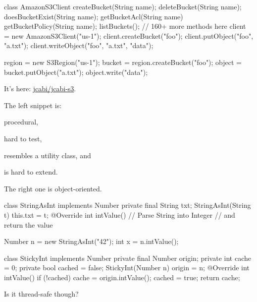 \documentclass{article}
\begin{document}

\begin{pptWide}{2}
{\scriptsize\begin{ffcode}
class AmazonS3Client {
  createBucket(String name);
  deleteBucket(String name);
  doesBucketExist(String name);
  getBucketAcl(String name)
  getBucketPolicy(String name);
  listBuckets();
  // 160+ more methods here
}
client = new AmazonS3Client("us-1");
client.createBucket("foo");
client.putObject("foo", "a.txt");
client.writeObject("foo", "a.txt", "data");
\end{ffcode}
}
\par\columnbreak\par
{\scriptsize\begin{ffcode}
region = new S3Region("us-1");
bucket = region.createBucket("foo");
object = bucket.putObject("a.txt");
object.write("data");
\end{ffcode}
}
It's here: \href{https://github.com/jcabi/jcabi-s3}{jcabi/jcabi-s3}.
\end{pptWide}
\par
The left snippet is:
\begin{inparaenum}[1)]
\item procedural,
\item hard to test,
\item resembles a utility class,
and
\item is hard to extend.
\end{inparaenum}
The right one is object-oriented.
\plush{}


\begin{pptWide}{2}
{\small\begin{ffcode}
class StringAsInt implements Number {
  private final String txt;
  StringAsInt(String t) { this.txt = t; }
  @Override int intValue() {
    // Parse String into Integer
    // and return the value
  }
}

Number n = new StringAsInt("42");
int x = n.intValue();
\end{ffcode}
}
\par\columnbreak\par
{\small\begin{ffcode}
class StickyInt implements Number {
  private final Number origin;
  private int cache = 0;
  private bool cached = false;
  StickyInt(Number n) { origin = n; }
  @Override int intValue() {
    if (!cached) {
      cache = origin.intValue();
      cached = true;
    }
    return cache; } }
\end{ffcode}
}
\end{pptWide}
\par
Is it thread-safe though?
\plush{}
\end{document}
